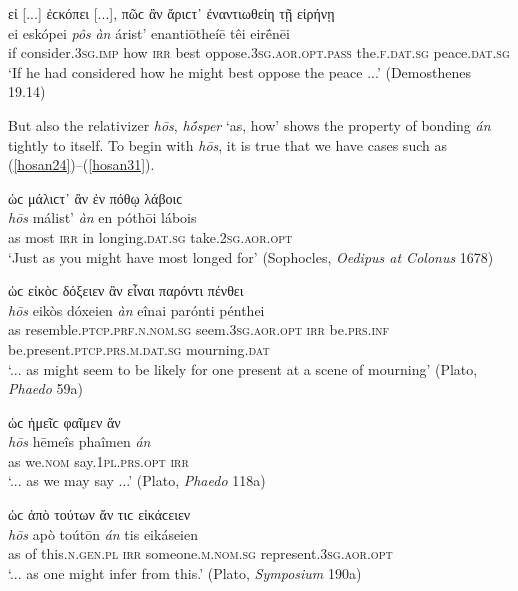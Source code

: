 \begin{exe}
\ex εἰ {[}...{]} ἐϲκόπει {[}...{]}, πῶϲ ἂν ἄριϲτ᾽ ἐναντιωθείη τῇ εἰρήνῃ\\
\gll ei eskópei \emph{pôs} \emph{àn} árist' enantiōtheíē têi eirḗnēi\\
if consider.\textsc{3sg.imp} how \textsc{irr} best oppose.\textsc{3sg.aor.opt.pass} the.\textsc{f.dat.sg} peace.\textsc{dat.sg}\\
\trans `If he had considered how he might best oppose the peace ...' (Demosthenes 19.14)
\label{posan2}
\end{exe}

But also the relativizer \emph{hōs}, \emph{hṓsper} `as, how' shows the property of bonding \emph{án} tightly to itself. To begin with \emph{hōs}, it is true that we have cases such as (\ref{hosan24})--(\ref{hosan31}).

\begin{exe}
\ex ὡϲ μάλιϲτ᾽ ἂν ἐν πόθῳ λάβοιϲ\\
\gll \emph{hōs} málist' \emph{àn} en póthōi lábois\\
as most \textsc{irr} in longing.\textsc{dat.sg} take.\textsc{2sg.aor.opt}\\
\trans `Just as you might have most longed for' (Sophocles, \textit{Oedipus at Colonus} 1678)
\label{hosan24}
\end{exe}

\begin{exe}
\ex ὡϲ εἰκὸϲ δόξειεν ἂν εἶναι παρόντι πένθει\\
\gll \emph{hōs} eikòs dóxeien \emph{àn} eînai parónti pénthei\\
as resemble.\textsc{ptcp.prf.n.nom.sg} seem.\textsc{3sg.aor.opt} \textsc{irr}
be.\textsc{prs.inf} be.present.\textsc{ptcp.prs.m.dat.sg} mourning.\textsc{dat}\\
\trans `... as might seem to be likely for one present at a scene of mourning' (Plato, \textit{Phaedo} 59a)
\label{hosan25}
\end{exe}

\begin{exe}
\ex ὡϲ ἡμεῖϲ φαῖμεν ἄν\\
\gll \emph{hōs} hēmeîs phaîmen \emph{án}\\
as we.\textsc{nom} say.\textsc{1pl.prs.opt} \textsc{irr}\\
\trans `... as we may say ...' (Plato, \textit{Phaedo} 118a)
\label{hosan26}
\end{exe}

\begin{exe}
\ex ὡϲ ἀπὸ τούτων ἄν τιϲ εἰκάϲειεν\\
\gll \emph{hōs} apò toútōn \emph{án} tis eikáseien\\
as of this.\textsc{n.gen.pl} \textsc{irr} someone.\textsc{m.nom.sg}
represent.\textsc{3sg.aor.opt}\\
\trans `... as one might infer from this.' (Plato, \textit{Symposium} 190a)
\label{hosan27}
\end{exe}

